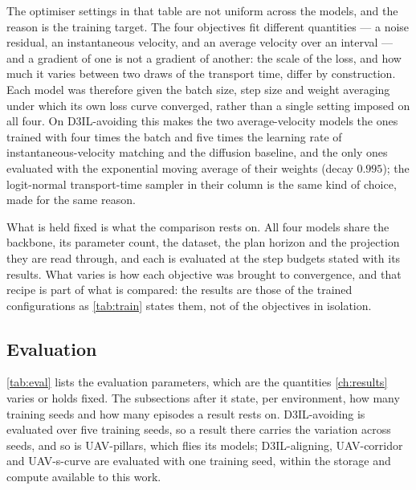 The optimiser settings in that table are not uniform across the models, and the reason is the training
target. The four objectives fit different quantities --- a noise residual, an instantaneous velocity, and
an average velocity over an interval --- and a gradient of one is not a gradient of another: the scale of
the loss, and how much it varies between two draws of the transport time, differ by construction. Each
model was therefore given the batch size, step size and weight averaging under which its own loss curve
converged, rather than a single setting imposed on all four. On D3IL-avoiding this makes the two
average-velocity models the ones trained with four times the batch and five times the learning rate of
instantaneous-velocity matching and the diffusion baseline, and the only ones evaluated with the
exponential moving average of their weights (decay $0.995$); the logit-normal transport-time sampler in their column is
the same kind of choice, made for the same reason.

What is held fixed is what the comparison rests on. All four models share the backbone, its parameter
count, the dataset, the plan horizon and the projection they are read through, and each is evaluated at
the step budgets stated with its results. What varies is how each objective was brought to convergence,
and that recipe is part of what is compared: the results are those of the trained configurations as
\autoref{tab:train} states them, not of the objectives in isolation.

\subsection{Evaluation}\label{sec:setup:protocol:eval}

\autoref{tab:eval} lists the evaluation parameters, which are the quantities \autoref{ch:results} varies or
holds fixed. The subsections after it state, per environment, how many training seeds and how many episodes
a result rests on. D3IL-avoiding is evaluated over five training seeds, so a result there carries the variation across seeds,
and so is UAV-pillars, which flies its models; D3IL-aligning, UAV-corridor and UAV-s-curve are evaluated
with one training seed, within the storage and compute available to this work.

